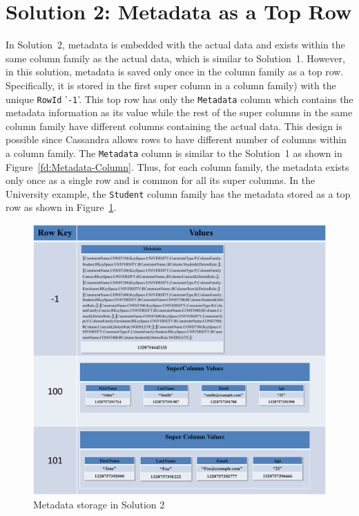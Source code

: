 
\section{Solution 2:  Metadata as a Top Row} \label{s:design-sol2}


In Solution~2,   metadata is embedded with the actual data and exists within the
same column family as the actual data, which is similar to Solution~1.
However,  in this solution,   metadata is saved only once in the column family
as a top row. Specifically, it is stored in the first super column in a column
family) with the unique \texttt{RowId} '\texttt{-1}'.  This top row has only the
\texttt{Metadata} column which contains the metadata information as its value
while the rest of the super columns in the same column family have different
columns containing the actual data.  This design is possible since Cassandra
allows rows to have different number of columns within a column family.  The
\texttt{Metadata} column is similar to the Solution~1 as shown in
Figure~\ref{fd:Metadata-Column}.  Thus,  for each column family,  the metadata
exists only once as a single row and is common for all its super columns.  In
the University example, the  \texttt{Student} column family has the metadata 
stored as a top row as  shown in Figure~\ref{fd:Metadata-Solution2}.
		 
	\begin{figure}[h]  
		\centering 
		\includegraphics[width=.8\textwidth]{./figure/Solutions/Sol2-MD-ColumnFamily.png}
		\caption{Metadata storage in Solution 2}\label{fd:Metadata-Solution2}
	\end{figure}
		

